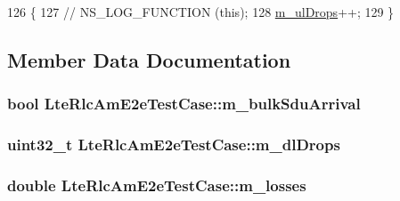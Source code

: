 \begin{DoxyCode}
126 \{
127   \textcolor{comment}{// NS\_LOG\_FUNCTION (this);}
128   \hyperlink{classLteRlcAmE2eTestCase_a341e4ba269f052efbd439ebacf09e6f0}{m\_ulDrops}++;
129 \}
\end{DoxyCode}


\subsection{Member Data Documentation}
\subsubsection[{\texorpdfstring{m\+\_\+bulk\+Sdu\+Arrival}{m_bulkSduArrival}}]{\setlength{\rightskip}{0pt plus 5cm}bool Lte\+Rlc\+Am\+E2e\+Test\+Case\+::m\+\_\+bulk\+Sdu\+Arrival\hspace{0.3cm}{\ttfamily [private]}}\hypertarget{classLteRlcAmE2eTestCase_a401b57783a0a1908adcf7a087757fb83}{}\label{classLteRlcAmE2eTestCase_a401b57783a0a1908adcf7a087757fb83}
\subsubsection[{\texorpdfstring{m\+\_\+dl\+Drops}{m_dlDrops}}]{\setlength{\rightskip}{0pt plus 5cm}uint32\+\_\+t Lte\+Rlc\+Am\+E2e\+Test\+Case\+::m\+\_\+dl\+Drops\hspace{0.3cm}{\ttfamily [private]}}\hypertarget{classLteRlcAmE2eTestCase_ab618569119894079072ea0e4867dcaeb}{}\label{classLteRlcAmE2eTestCase_ab618569119894079072ea0e4867dcaeb}
\subsubsection[{\texorpdfstring{m\+\_\+losses}{m_losses}}]{\setlength{\rightskip}{0pt plus 5cm}double Lte\+Rlc\+Am\+E2e\+Test\+Case\+::m\+\_\+losses\hspace{0.3cm}{\ttfamily [private]}}\hypertarget{classLteRlcAmE2eTestCase_afbb72ea6f3599c57b19be03be5e43878}{}\label{classLteRlcAmE2eTestCase_afbb72ea6f3599c57b19be03be5e43878}
